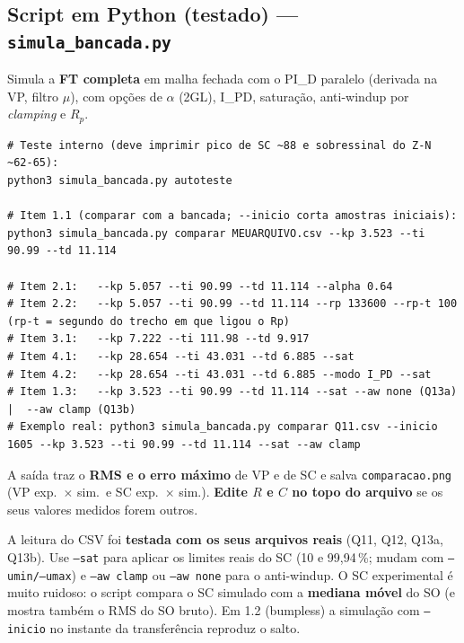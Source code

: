 \documentclass[11pt,a4paper]{article}
\begin{document}
\subsection{Script em Python (testado) --- \texttt{simula\_bancada.py}}
Simula a \textbf{FT completa} em malha fechada com o PI\_D paralelo (derivada na VP, filtro $\mu$), com opções de $\alpha$ (2GL), I\_PD, saturação, anti-windup por \emph{clamping} e $R_p$.
\begin{lstlisting}
# Teste interno (deve imprimir pico de SC ~88 e sobressinal do Z-N ~62-65):
python3 simula_bancada.py autoteste

# Item 1.1 (comparar com a bancada; --inicio corta amostras iniciais):
python3 simula_bancada.py comparar MEUARQUIVO.csv --kp 3.523 --ti 90.99 --td 11.114

# Item 2.1:   --kp 5.057 --ti 90.99 --td 11.114 --alpha 0.64
# Item 2.2:   --kp 5.057 --ti 90.99 --td 11.114 --rp 133600 --rp-t 100   (rp-t = segundo do trecho em que ligou o Rp)
# Item 3.1:   --kp 7.222 --ti 111.98 --td 9.917
# Item 4.1:   --kp 28.654 --ti 43.031 --td 6.885 --sat
# Item 4.2:   --kp 28.654 --ti 43.031 --td 6.885 --modo I_PD --sat
# Item 1.3:   --kp 3.523 --ti 90.99 --td 11.114 --sat --aw none (Q13a)  |  --aw clamp (Q13b)
# Exemplo real: python3 simula_bancada.py comparar Q11.csv --inicio 1605 --kp 3.523 --ti 90.99 --td 11.114 --sat --aw clamp
\end{lstlisting}
A saída traz o \textbf{RMS e o erro máximo} de VP e de SC e salva \texttt{comparacao.png} (VP exp.\ $\times$ sim.\ e SC exp.\ $\times$ sim.). \textbf{Edite $R$ e $C$ no topo do arquivo} se os seus valores medidos forem outros.
\begin{alerta}A leitura do CSV foi \textbf{testada com os seus arquivos reais} (Q11, Q12, Q13a, Q13b). Use \texttt{--sat} para aplicar os limites reais do SC (10 e 99,94\,\%; mudam com \texttt{--umin/--umax}) e \texttt{--aw clamp} ou \texttt{--aw none} para o anti-windup. O SC experimental é muito ruidoso: o script compara o SC simulado com a \textbf{mediana móvel} do SO (e mostra também o RMS do SO bruto). Em 1.2 (bumpless) a simulação com \texttt{--inicio} no instante da transferência reproduz o salto.\end{alerta}
\end{document}
